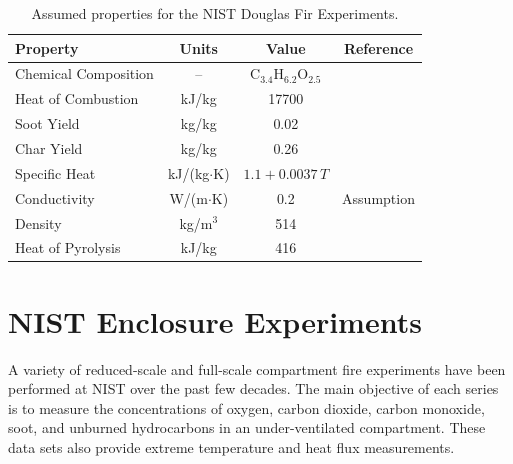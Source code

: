 \begin{table}
\begin{center}
\caption[Assumed properties for the NIST Douglas Fir Experiments]{Assumed properties for the NIST Douglas Fir Experiments.}
\label{Assumed_Properties_Trees}
\begin{tabular}{|l|c|c|c|}
\hline
Property                        & Units                 & Value                              & Reference                             \\ \hline \hline
Chemical Composition            & --                    & C$_{3.4}$H$_{6.2}$O$_{2.5}$        & \cite{Ritchie:1}                      \\ \hline
Heat of Combustion              & kJ/kg                 & 17700                              & \cite{Susott:FS1982}                  \\ \hline
Soot Yield                      & kg/kg                 & 0.02                               & \cite{Mell:2009}                      \\ \hline
Char Yield                      & kg/kg                 & 0.26                               & \cite{Susott:FS1982}                  \\ \hline
Specific Heat                   & kJ/(kg$\cdot$K)       & $1.1+0.0037 \, T$                  & \cite{Parker:1989}                    \\ \hline
Conductivity                    & W/(m$\cdot$K)         & 0.2                                & Assumption                            \\ \hline
Density                         & kg/m$^3$              & 514                                & \cite{Rothermel:1972}                 \\ \hline
Heat of Pyrolysis               & kJ/kg                 & 416                                & \cite{Morvan:CF2004}                  \\ \hline
\end{tabular}
\end{center}
\end{table}


\section{NIST Enclosure Experiments}
\label{NIST_Enclosure_Description}

A variety of reduced-scale and full-scale compartment fire experiments have been performed at NIST over the past few decades. The main objective of each series is to measure the concentrations of oxygen, carbon dioxide, carbon monoxide, soot, and unburned hydrocarbons in an under-ventilated compartment. These data sets also provide extreme temperature and heat flux measurements.

